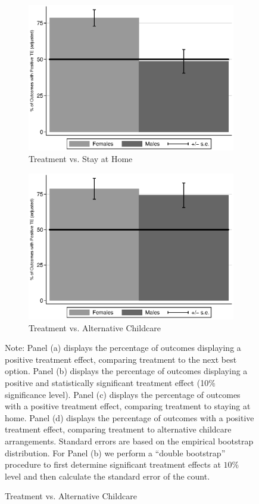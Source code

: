 \begin{figure}
\begin{subfigure}[h]{0.4\textwidth}
		\caption{ Treatment vs. Stay at Home} \label{fig:ppositivehome}
		\includegraphics[width=\textwidth]{output/epan_ipw_p0_all.eps}
\end{subfigure}%
\begin{subfigure}[h]{0.4\textwidth}
	\centering
	\caption{Treatment vs. Alternative Childcare} \label{fig:ppositivealternative}
		\includegraphics[width=\textwidth]{output/epan_ipw_p1_all.eps}
\end{subfigure}
\scriptsize \justify
Note: Panel (a) displays the percentage of outcomes displaying a positive treatment effect, comparing treatment to the next best option. Panel (b) displays the percentage of outcomes displaying a positive and statistically significant treatment effect (10\% significance level). Panel (c) displays the percentage of outcomes with a positive treatment effect, comparing treatment to staying at home. Panel (d) displays the percentage of outcomes with a positive treatment effect, comparing treatment to alternative childcare arrangements. Standard errors are based on the empirical bootstrap distribution. For Panel (b) we perform a ``double bootstrap'' procedure to first determine significant treatment effects at $10\%$ level and then calculate the standard error of the count.\\
\end{figure}

